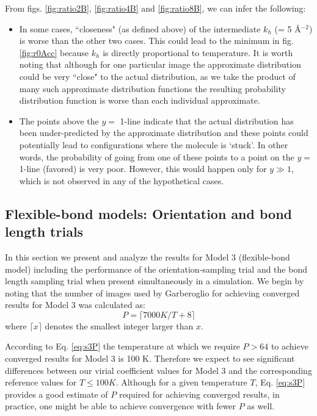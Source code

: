                 From figs. \ref{fig:ratio2B}, \ref{fig:ratio4B} and \ref{fig:ratio8B}, we can infer the following:
                \begin{itemize}
                    \item In some cases, ``closeness" (as defined above) of the intermediate $k_h$ (= 5 \AA$^{-2}$) is worse than the other two cases. This could lead to the minimum in fig. \ref{fig:r0Acc} because $k_h$ is directly proportional to temperature. It is worth noting that although for one particular image the approximate distribution could be very ``close" to the actual distribution, as we take the product of many such approximate distribution functions the resulting probability distribution function is worse than each individual approximate.
                    \item The points above the $y =$ 1-line indicate  that the actual distribution has been under-predicted by the approximate distribution and these points could potentially lead to configurations where the molecule is `stuck'. In other words, the probability of going from one of these points to a point on the $y =$ 1-line (favored) is very poor. However, this would happen only for $y \gg 1$, which is not observed in any of the hypothetical cases.
                \end{itemize}

        \subsection{Flexible-bond models: Orientation and bond length trials}
            In this section we present and analyze the results for Model 3 (flexible-bond model) including the performance of the orientation-sampling trial and the bond length sampling trial when present simultaneously in a simulation. We begin by noting that the number of images used by Garberoglio for achieving converged results \cite{Garberoglio2014} for Model 3 was calculated as:
            \begin{equation}
            \label{eq:s3P}
                P = \lceil 7000 K/T + 8 \rceil
            \end{equation}
            where $\lceil x \rceil$ denotes the smallest integer larger than $x$.

            According to Eq. \eqref{eq:s3P} the temperature at which we require $P > 64$ to achieve converged results for Model 3 is 100 K. Therefore we expect to see significant differences between our virial coefficient values for Model 3 and the corresponding reference values for $T \le 100 K$. Although for a given temperature $T$, Eq. \eqref{eq:s3P} provides a good estimate of $P$ required for achieving converged results, in practice, one might be able to achieve convergence with fewer $P$ as well.

